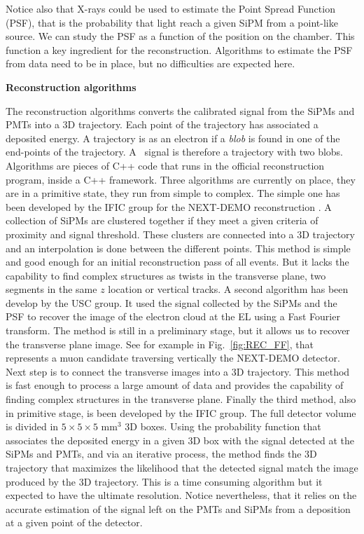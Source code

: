 Notice also that X-rays could be used to estimate the Point Spread Function (PSF), that is the probability that light reach a given SiPM from a point-like source. We can study the PSF as a function of the position on the chamber. This function a key ingredient for the reconstruction. Algorithms to estimate the PSF from data need to be in place, but no difficulties are expected here.  
 
{\bf Reconstruction algorithms}

The reconstruction algorithms converts the calibrated signal from the SiPMs and PMTs into a 3D trajectory. Each point of the trajectory has associated a deposited energy. 
A trajectory is as an electron if a {\it blob} is found in one of the end-points of the trajectory. 
A \bb ~signal is therefore a trajectory with two blobs.
Algorithms are pieces of C++ code that runs in the official reconstruction program, inside a C++ framework.
Three algorithms are currently on place, they are in a primitive state, they run from simple to complex.
The simple one has been developed by the IFIC group for the NEXT-DEMO reconstruction \cite{NEXT-DEMO2}. A collection of SiPMs are clustered together if they meet a given criteria of proximity and signal threshold. These clusters are connected into a 3D trajectory and an interpolation is done between the different points. This method is simple and good enough for an initial reconstruction pass of all events. But it lacks the capability to find complex structures as twists in the transverse plane, two segments in the same $z$ location or vertical tracks. 
A second algorithm has been develop by the USC group. It used the signal collected by the SiPMs and the PSF to recover the image of the electron cloud at the EL using a Fast Fourier transform. The method is still in a preliminary stage, but it allows us to recover the transverse plane image. See for example in Fig.~\ref{fig:REC_FF}, that represents a muon candidate traversing vertically the NEXT-DEMO detector. Next step is to connect the transverse images into a 3D trajectory. This method is fast enough to process a large amount of data and provides the capability of finding complex structures in the transverse plane. 
Finally the third method, also in primitive stage, is been developed by the IFIC group. The full detector volume is divided in $5\times5\times5$ mm$^3$ 3D boxes. Using the probability function that associates the deposited energy in a given 3D box with the signal detected at the SiPMs and PMTs, and via an iterative process, the method finds the 3D trajectory that maximizes the likelihood that the detected signal match the image produced by the 3D trajectory. This is a time consuming algorithm but it expected to have the ultimate resolution. Notice nevertheless, that it relies on the accurate estimation of the signal left on the PMTs and SiPMs from a deposition at a given point of the detector. 

